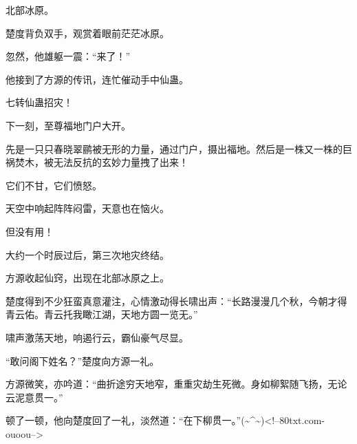 \begin{this_body}
北部冰原。

楚度背负双手，观赏着眼前茫茫冰原。

忽然，他雄躯一震：“来了！”

他接到了方源的传讯，连忙催动手中仙蛊。

七转仙蛊招灾！

下一刻，至尊福地门户大开。

先是一只只春晓翠鹂被无形的力量，通过门户，摄出福地。然后是一株又一株的巨祸焚木，被无法反抗的玄妙力量拽了出来！

它们不甘，它们愤怒。

天空中响起阵阵闷雷，天意也在恼火。

但没有用！

大约一个时辰过后，第三次地灾终结。

方源收起仙窍，出现在北部冰原之上。

楚度得到不少狂蛮真意灌注，心情激动得长啸出声：“长路漫漫几个秋，今朝才得青云佑。青云托我瞰江湖，天地方圆一览无。”

啸声激荡天地，响遏行云，霸仙豪气尽显。

“敢问阁下姓名？”楚度向方源一礼。

方源微笑，亦吟道：“曲折途穷天地窄，重重灾劫生死微。身如柳絮随飞扬，无论云泥意贯一。”

顿了一顿，他向楚度回了一礼，淡然道：“在下柳贯一。”(\~{}\^{}\~{})<!--80txt.com-ouoou-->

\end{this_body}


